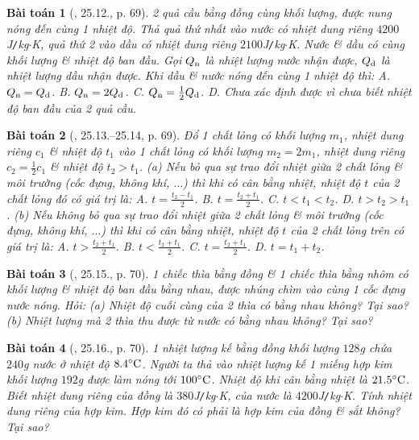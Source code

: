 \documentclass{article}
\newtheorem{baitoan}{Bài toán}
\begin{document}
\begin{baitoan}[\cite{SBT_Vat_Ly_8}, 25.12., p. 69]
	2 quả cầu bằng đồng cùng khối lượng, được nung nóng đến cùng 1 nhiệt độ. Thả quả thứ nhất vào nước có nhiệt dung riêng $4200$\emph{J\texttt{/}kg$\cdot$K}, quả thứ 2 vào dầu có nhiệt dung riêng $2100$\emph{J\texttt{/}kg$\cdot$K}. Nước \& dầu có cùng khối lượng \& nhiệt độ ban đầu. Gọi $Q_{\rm n}$ là nhiệt lượng nước nhận được, $Q_{\rm d}$ là nhiệt lượng dầu nhận được. Khi dầu \& nước nóng đến cùng 1 nhiệt độ thì: {\sf A.} $Q_{\rm n} = Q_{\rm d}$. {\sf B.} $Q_{\rm n} = 2Q_{\rm d}$. {\sf C.} $Q_{\rm n} = \frac{1}{2}Q_{\rm d}$. {\sf D.} Chưa xác định được vì chưa biết nhiệt độ ban đầu của 2 quả cầu.
\end{baitoan}

\begin{baitoan}[\cite{SBT_Vat_Ly_8}, 25.13.--25.14, p. 69]
	Đổ 1 chất lỏng có khối lượng $m_1$, nhiệt dung riêng $c_1$ \& nhiệt độ $t_1$ vào 1 chất lỏng có khối lượng $m_2 = 2m_1$, nhiệt dung riêng $c_2 = \frac{1}{2}c_1$ \& nhiệt độ $t_2 > t_1$. (a) Nếu bỏ qua sự trao đổi nhiệt giữa 2 chất lỏng \& môi trường (cốc đựng, không khí, $\ldots$) thì khi có cân bằng nhiệt, nhiệt độ $t$ của 2 chất lỏng đó có giá trị là: {\sf A.} $t = \frac{t_2 - t_1}{2}$. {\sf B.} $t = \frac{t_2 + t_1}{2}$. {\sf C.} $t < t_1 < t_2$. {\sf D.} $t > t_2 > t_1$. (b) Nếu không bỏ qua sự trao đổi nhiệt giữa 2 chất lỏng \& môi trường (cốc đựng, không khí, $\ldots$) thì khi có cân bằng nhiệt, nhiệt độ $t$ của 2 chất lỏng trên có giá trị là: {\sf A.} $t > \frac{t_2 + t_1}{2}$. {\sf B.} $t < \frac{t_2 + t_1}{2}$. {\sf C.} $t = \frac{t_2 + t_1}{2}$. {\sf D.} $t = t_1 + t_2$.
\end{baitoan}

\begin{baitoan}[\cite{SBT_Vat_Ly_8}, 25.15., p. 70]
	1 chiếc thìa bằng đồng \& 1 chiếc thìa bằng nhôm có khối lượng \& nhiệt độ ban đầu bằng nhau, được nhúng chìm vào cùng 1 cốc đựng nước nóng. Hỏi: (a) Nhiệt độ cuối cùng của 2 thìa có bằng nhau không? Tại sao? (b) Nhiệt lượng mà 2 thìa thu được từ nước có bằng nhau không? Tại sao?
\end{baitoan}

\begin{baitoan}[\cite{SBT_Vat_Ly_8}, 25.16., p. 70]
	1 nhiệt lượng kế bằng đồng khối lượng $128$\emph{g} chứa $240$\emph{g} nước ở nhiệt độ $8.4^\circ{\rm C}$. Người ta thả vào nhiệt lượng kế 1 miếng hợp kim khối lượng $192$\emph{g} được làm nóng tới $100^\circ{\rm C}$. Nhiệt độ khi cân bằng nhiệt là $21.5^\circ{\rm C}$. Biết nhiệt dung riêng của đồng là $380$\emph{J\texttt{/}kg$\cdot$K}, của nước là $4200$\emph{J\texttt{/}kg$\cdot$K}. Tính nhiệt dung riêng của hợp kim. Hợp kim đó có phải là hợp kim của đồng \& sắt không? Tại sao?
\end{baitoan}
\end{document}
